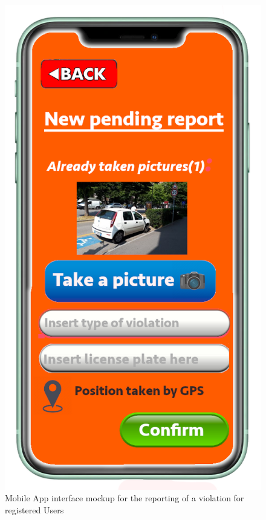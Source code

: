 \documentclass[a4paper]{report}
\begin{document}
\begin{figure}
\begin{minipage}{.45\textwidth}
\centering
\includegraphics[width=.7\linewidth]{mockups/Report.png}
\caption[Mobile App mockup for the report page]{Mobile App interface mockup for the reporting of a violation for registered Users}
\label{fig:report-page}
\end{minipage}\hfill
\begin{minipage}{.45\textwidth}
\centering

\end{minipage}
\end{figure}
\end{document}
